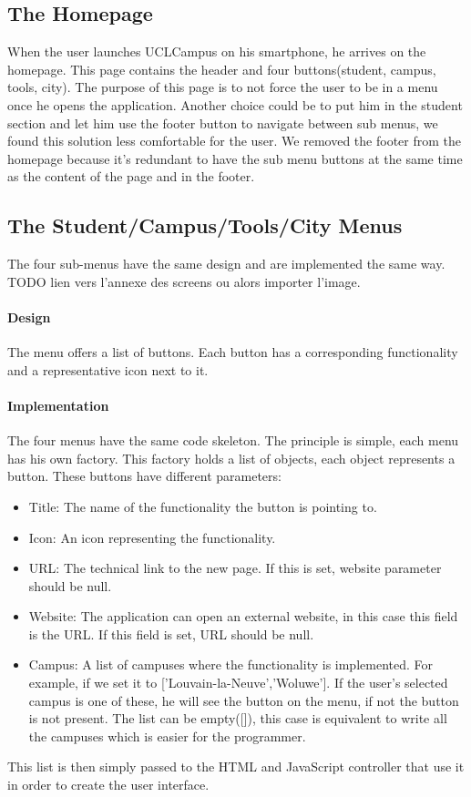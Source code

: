 \documentclass{eplmastersthesis}
\begin{document}
\subsection{The Homepage}
When the user launches UCLCampus on his smartphone, he arrives on the homepage. This page contains the header and four buttons(student, campus, tools, city). The purpose of this page is to not force the user to be in a menu once he opens the application. Another choice could be to put him in the student section and let him use the footer button to navigate between sub menus, we found this solution less comfortable for the user. We removed the footer from the homepage because it's redundant to have the sub menu buttons at the same time as the content of the page and in the footer.
\subsection{The Student/Campus/Tools/City Menus}
The four sub-menus have the same design and are implemented the same way.
TODO lien vers l'annexe des screens ou alors importer l'image. 
\paragraph{Design}
The menu offers a list of buttons. Each button has a corresponding functionality and a representative icon next to it.
\paragraph{Implementation}
The four menus have the same code skeleton. The principle is simple, each menu has his own factory. This factory holds a list of objects, each object represents a button. These buttons have different parameters: 
\begin{itemize}
\item Title: The name of the functionality the button is pointing to.
\item Icon: An icon representing the functionality.
\item URL: The technical link to the new page. If this is set, website parameter should be null.
\item Website: The application can open an external website, in this case this field is the URL. If this field is set, URL should be null.
\item Campus: A list of campuses where the functionality is implemented. For example, if we set it to ['Louvain-la-Neuve','Woluwe']. If the user's selected campus is one of these, he will see the button on the menu, if not the button is not present. The list can be empty([]), this case is equivalent to write all the campuses which is easier for the programmer. 
\end{itemize}
This list is then simply passed to the HTML and JavaScript controller that use it in order to create the user interface.
\end{document}
